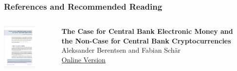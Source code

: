 \documentclass[]{beamer}
\begin{document}
\begin{frame}%
\frametitle{References and Recommended Reading}

		\begin{columns}[T]
			\begin{column}{0.1\textwidth}
					\includegraphics[width = 1.7cm, frame]{../assets/images/central_bank_crypto.png}
			\end{column} %
			\begin{column}{0.8\textwidth}
				\textbf{The Case for Central Bank Electronic Money and \\ the Non-Case for Central Bank Cryptocurrencies} \\ 
				Aleksander Berentsen and Fabian Schär \\
				\link \href{https://research.stlouisfed.org/publications/review/2018/02/13/the-case-for-central-bank-electronic-money-and-the-non-case-for-central-bank-cryptocurrencies}{Online Version}
			\end{column}
		\end{columns}
\end{frame}
	
\end{document}
